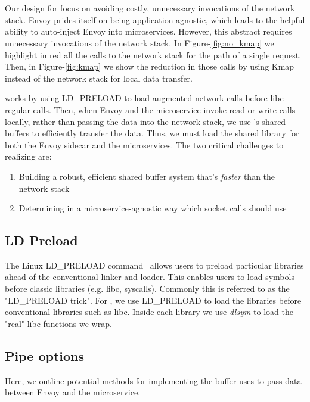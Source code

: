 \section{\sysname}
\label{sec:design}
Our design for \sysname focus on avoiding costly, unnecessary invocations of the network stack.
Envoy prides itself on being application agnostic, which leads to the helpful ability to auto-inject Envoy into microservices.
However, this abstract requires unnecessary invocations of the network stack.
In Figure-\ref{fig:no_kmap} we highlight in red all the calls to the network stack for the path of a single request.
Then, in Figure-\ref{fig:kmap} we show the reduction in those calls by using Kmap instead of the network stack for local data transfer.

\sysname works by using LD\_PRELOAD to load augmented network calls before libc regular calls.
Then, when Envoy and the microservice invoke read or write calls locally, rather than passing the data
into the network stack, we use \sysname's shared buffers to efficiently transfer the data.
Thus, we must load the shared library for both the Envoy sidecar and the microservices.
The two critical challenges to realizing \sysname are:
\begin{enumerate}
    \item Building a robust, efficient shared buffer system that's \textit{faster} than the network stack
    \item Determining in a microservice-agnostic way which socket calls should use \sysname
\end{enumerate}

%

\subsection{LD Preload}
The Linux LD\_PRELOAD command~\cite{ldpreload} allows users to preload particular libraries ahead of the conventional linker and loader.
This enables users to load symbols before classic libraries (e.g. libc, syscalls).
Commonly this is referred to as the "LD\_PRELOAD trick".
For \sysname, we use LD\_PRELOAD to load the \sysname libraries before conventional libraries such as libc.
Inside each \sysname library we use \textit{dlsym} to load the "real" libc functions we wrap.

\subsection{Pipe options}
Here, we outline potential methods for implementing the buffer \sysname uses to pass data between Envoy and the microservice.

